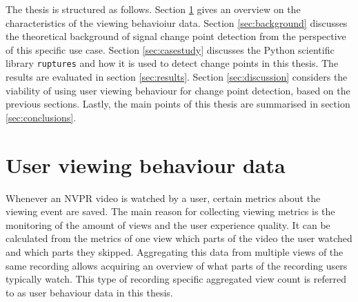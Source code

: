The thesis is structured as follows. Section \ref{sec:data} gives an overview on the characteristics of the viewing behavioiur data. Section \ref{sec:background} discusses the theoretical background of signal change point detection from the perspective of this specific use case. %
Section \ref{sec:casestudy} discusses the Python scientific library \texttt{ruptures} and how it is used to detect change points in this thesis. The results are evaluated in section \ref{sec:results}. Section \ref{sec:discussion} considers the viability of using user viewing behaviour for change point detection, based on the previous sections. Lastly, the main points of this thesis are summarised in section \ref{sec:conclusions}.

\section{User viewing behaviour data} \label{sec:data} %

Whenever an NVPR video is watched by a user, certain metrics about the viewing event are saved. The main reason for collecting viewing metrics is the monitoring of the amount of views and the user experience quality. It can be calculated from the metrics of one view which parts of the video the user watched and which parts they skipped. Aggregating this data from multiple views of the same recording allows acquiring an overview of what parts of the recording users typically watch. This type of recording specific aggregated view count is referred to as user behaviour data in this thesis.

